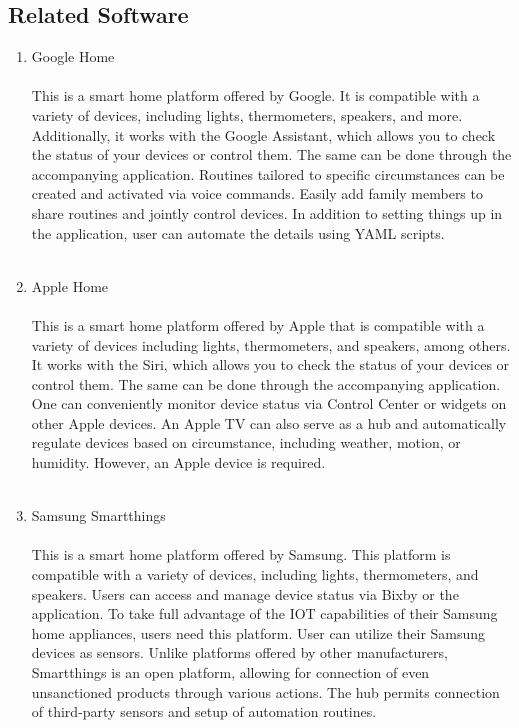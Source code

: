 \subsection {\large{Related Software}}
\begin{enumerate}[label=\alph*]
    \item Google Home\\
        \\
          This is a smart home platform offered by Google. It is compatible with a variety of devices, including lights, thermometers, speakers, and more. Additionally, it works with the Google Assistant, which allows you to check the status of your devices or control them. The same can be done through the accompanying application. Routines tailored to specific circumstances can be created and activated via voice commands. Easily add family members to share routines and jointly control devices. In addition to setting things up in the application, user can automate the details using YAML scripts.\\\\

    \item Apple Home\\
        \\
          This is a smart home platform offered by Apple that is compatible with a variety of devices including lights, thermometers, and speakers, among others. It works with the Siri, which allows you to check the status of your devices or control them. The same can be done through the accompanying application. One can conveniently monitor device status via Control Center or widgets on other Apple devices. An Apple TV can also serve as a hub and automatically regulate devices based on circumstance, including weather, motion, or humidity. However, an Apple device is required.\\\\

    \item Samsung Smartthings\\
        \\
          This is a smart home platform offered by Samsung. This platform is compatible with a variety of devices, including lights, thermometers, and speakers. Users can access and manage device status via Bixby or the application. To take full advantage of the IOT capabilities of their Samsung home appliances, users need this platform. User can utilize their Samsung devices as sensors. Unlike platforms offered by other manufacturers, Smartthings is an open platform, allowing for connection of even unsanctioned products through various actions. The hub permits connection of third-party sensors and setup of automation routines.\\\\


\end{enumerate}
